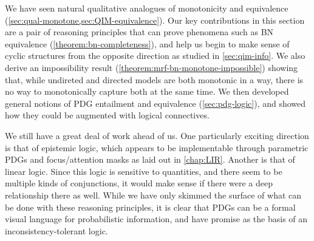 We have seen natural qualitative analogues of monotonicity and equivalence (\cref{sec:qual-monotone,sec:QIM-equivalence}). 
Our key contributions in this section are a pair of reasoning principles that can prove phenomena such as BN equivalence (\cref{theorem:bn-completeness}), and help us begin to make sense of cyclic structures from the opposite direction as studied in \cref{sec:qim-info}. 
We also derive an impossibility result (\cref{theorem:mrf-bn-monotone-impossible}) showing that, while undireted and directed models are both monotonic in a way, there is no way to monotonically capture both at the same time.
We then developed general notions of PDG entailment and equivalence (\cref{sec:pdg-logic}), 
and showed how they could be augmented with logical connectives.


We still have a great deal of work ahead of us. 
One particularly exciting direction is that of epistemic logic, which appears to be implementable through parametric PDGs and focus/attention masks as laid out in \cref{chap:LIR}. 
%
Another is that of linear logic. Since this logic is sensitive to quantities, and there seem to be multiple kinds of conjunctions, it would make sense if there were a deep relationship there as well.
While we have only skimmed the surface of what can be done with these reasoning principles, it is clear that PDGs can be a formal visual language for probabilistic information, and have promise as the basis of an inconsistency-tolerant logic. 

